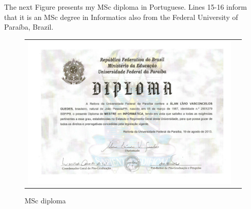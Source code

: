 \documentclass[10pt,a4paper,sans,colorlinks]{moderncv}
\begin{document}
The next Figure presents my MSc diploma in Portuguese.
Lines 15-16 inform that it is an MSc degree in Informatics also from the Federal University of Paraíba, Brazil.

\begin{figure}
  \begin{tabularx}{\textwidth}{X p{1cm}}
    \includegraphics[align=t,width=\textwidth, keepaspectratio]{../static/certificates/msc-diploma.pdf}
  \end{tabularx}
  \caption{MSc diploma}
\end{figure}


\newpage
\end{document}
